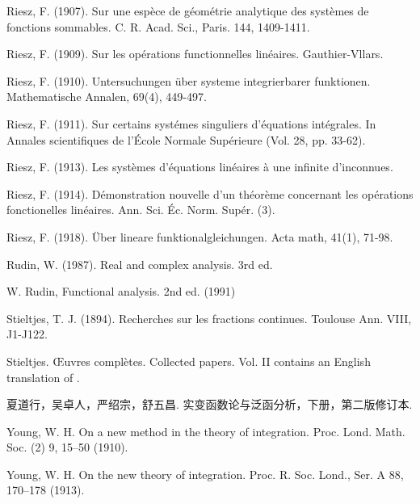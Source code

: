 \documentclass[12pt,b5paper,notitlepage]{article}
\theoremstyle{definition}
\theoremstyle{plain}
\numberwithin{equation}{section}
\begin{document}
\begin{thebibliography}{999999}
Riesz, F. (1907). Sur une esp{\`e}ce de g{\'e}om{\'e}trie analytique des syst{\`e}mes de fonctions sommables. C. R. Acad. Sci., Paris.  144, 1409-1411.



Riesz, F. (1909). Sur les op\'erations functionnelles lin\'eaires. Gauthier-Vllars.

Riesz, F. (1910). Untersuchungen \"uber systeme integrierbarer funktionen. Mathematische Annalen, 69(4), 449-497.


Riesz, F. (1911). Sur certains syst\'emes singuliers d'\'equations int\'egrales. In Annales scientifiques de l'\'Ecole Normale Sup\'erieure (Vol. 28, pp. 33-62).

Riesz, F. (1913). Les syst\`emes d'\'equations lin\'eaires \`a une infinite d'inconnues.


Riesz, F. (1914). D{\'e}monstration nouvelle d'un th{\'e}or{\`e}me concernant les op{\'e}rations fonctionelles lin{\'e}aires. Ann. Sci. {\'E}c. Norm. Sup{\'e}r. (3).

Riesz, F. (1918). \"Uber lineare funktionalgleichungen. Acta math, 41(1), 71-98.

Rudin, W. (1987). Real and complex analysis. 3rd ed.

W. Rudin, Functional analysis. 2nd ed. (1991)


Stieltjes, T. J. (1894). Recherches sur les fractions continues. Toulouse Ann. VIII, J1-J122.

Stieltjes. {\OE}uvres compl{\`e}tes. {Collected} papers. Vol. II contains an English translation of \cite{Sti94}.


\begin{CJK*}{UTF8}{gkai}
夏道行，吴卓人，严绍宗，舒五昌. 实变函数论与泛函分析，下册，第二版修订本.
\end{CJK*}


Young, W. H. On a new method in the theory of integration. Proc. Lond. Math. Soc. (2) 9, 15--50 (1910).

Young, W. H. On the new theory of integration.  Proc. R. Soc. Lond., Ser. A 88, 170--178 (1913).


		
\end{thebibliography}


\end{document}
